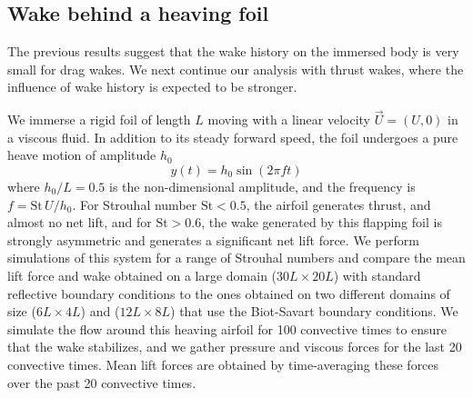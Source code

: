 \documentclass[final,1p,times]{elsarticle}
\begin{document}
\subsection{Wake behind a heaving foil}

The previous results suggest that the wake history on the immersed body is very small for drag wakes. We next continue our analysis with thrust wakes, where the influence of wake history is expected to be stronger.

We immerse a rigid foil of length $L$ moving with a linear velocity $\vec{U}=(U,0)$ in a viscous fluid. In addition to its steady forward speed, the foil undergoes a pure heave motion of amplitude $h_0$
\begin{equation}
    y(t) = h_0 \sin(2\pi f t)
\end{equation}
where $h_0/L=0.5$ is the non-dimensional amplitude, and the frequency is $f = \text{St}\,U/h_0$. For Strouhal number $\text{St}<0.5$, the airfoil generates thrust, and almost no net lift, and for $\text{St}>0.6$, the wake generated by this flapping foil is strongly asymmetric and generates a significant net lift force. We perform simulations of this system for a range of Strouhal numbers and compare the mean lift force and wake obtained on a large domain ($30L\times20L$) with standard reflective boundary conditions to the ones obtained on two different domains of size ($6L\times4L$) and ($12L\times8L$) that use the Biot-Savart boundary conditions. We simulate the flow around this heaving airfoil for 100 convective times to ensure that the wake stabilizes, and we gather pressure and viscous forces for the last 20 convective times. Mean lift forces are obtained by time-averaging these forces over the past 20 convective times.
\end{document}
